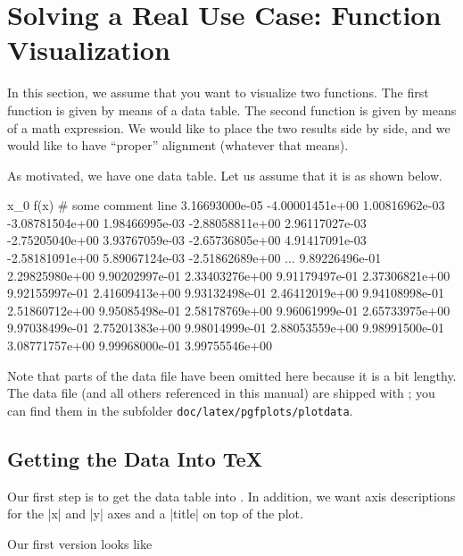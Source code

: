 
\section{Solving a Real Use Case: Function Visualization}

In this section, we assume that you want to visualize two functions. The first
function is given by means of a data table. The second function is given by
means of a math expression. We would like to place the two results side by
side, and we would like to have ``proper'' alignment (whatever that means).

As motivated, we have one data table. Let us assume that it is as shown below.
%
\begin{codeexample}
x_0	f(x)
# some comment line
3.16693000e-05	-4.00001451e+00
1.00816962e-03	-3.08781504e+00
1.98466995e-03	-2.88058811e+00
2.96117027e-03	-2.75205040e+00
3.93767059e-03	-2.65736805e+00
4.91417091e-03	-2.58181091e+00
5.89067124e-03	-2.51862689e+00
...
9.89226496e-01	2.29825980e+00
9.90202997e-01	2.33403276e+00
9.91179497e-01	2.37306821e+00
9.92155997e-01	2.41609413e+00
9.93132498e-01	2.46412019e+00
9.94108998e-01	2.51860712e+00
9.95085498e-01	2.58178769e+00
9.96061999e-01	2.65733975e+00
9.97038499e-01	2.75201383e+00
9.98014999e-01	2.88053559e+00
9.98991500e-01	3.08771757e+00
9.99968000e-01	3.99755546e+00
\end{codeexample}
%
Note that parts of the data file have been omitted here because it is a bit
lengthy. The data file (and all others referenced in this manual) are shipped
with \PGFPlots{}; you can find them in the subfolder
\texttt{doc/latex/pgfplots/plotdata}.


\subsection{Getting the Data Into \TeX{}}
\label{sec:tut1:step1}

Our first step is to get the data table into \PGFPlots{}. In addition, we want
axis descriptions for the |x| and |y| axes and a |title| on top of the plot.

Our first version looks like
%
\begin{codeexample}[]

%

%
\end{codeexample}

